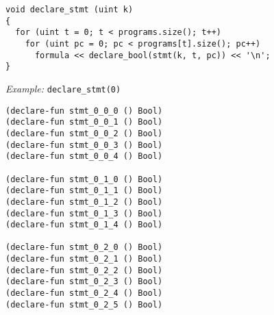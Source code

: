 





\begin{lstlisting}[style=c++]
void declare_stmt (uint k)
{
  for (uint t = 0; t < programs.size(); t++)
    for (uint pc = 0; pc < programs[t].size(); pc++)
      formula << declare_bool(stmt(k, t, pc)) << '\n';
}
\end{lstlisting}

\newpage

\noindent
\emph{Example:} \lstinline[style=c++]{declare_stmt(0)}

\begin{lstlisting}[language=smtlib]
(declare-fun stmt_0_0_0 () Bool)
(declare-fun stmt_0_0_1 () Bool)
(declare-fun stmt_0_0_2 () Bool)
(declare-fun stmt_0_0_3 () Bool)
(declare-fun stmt_0_0_4 () Bool)

(declare-fun stmt_0_1_0 () Bool)
(declare-fun stmt_0_1_1 () Bool)
(declare-fun stmt_0_1_2 () Bool)
(declare-fun stmt_0_1_3 () Bool)
(declare-fun stmt_0_1_4 () Bool)

(declare-fun stmt_0_2_0 () Bool)
(declare-fun stmt_0_2_1 () Bool)
(declare-fun stmt_0_2_2 () Bool)
(declare-fun stmt_0_2_3 () Bool)
(declare-fun stmt_0_2_4 () Bool)
(declare-fun stmt_0_2_5 () Bool)
\end{lstlisting}

